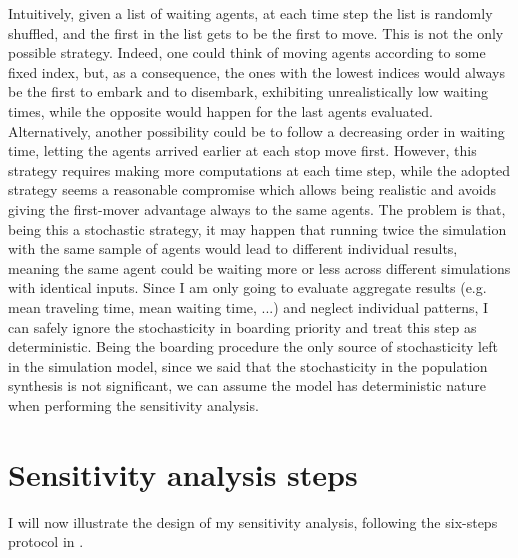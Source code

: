 Intuitively, given a list of waiting agents, at each time step the list is randomly shuffled, and the first in the list gets to be the first to move. This is not the only possible strategy. Indeed, one could think of moving agents according to some fixed index, but, as a consequence, the ones with the lowest indices would always be the first to embark and to disembark, exhibiting unrealistically low waiting times, while the opposite would happen for the last agents evaluated. Alternatively, another possibility could be to follow a decreasing order in waiting time, letting the agents arrived earlier at each stop move first. However, this strategy requires making more computations at each time step, while the adopted strategy seems a reasonable compromise which allows being realistic and avoids giving the first-mover advantage always to the same agents. The problem is that, being this a stochastic strategy, it may happen that running twice the simulation with the same sample of agents would lead to different individual results, meaning the same agent could be waiting more or less across different simulations with identical inputs. Since I am only going to evaluate aggregate results (e.g. mean traveling time, mean waiting time, ...) and neglect individual patterns, I can safely ignore the stochasticity in boarding priority and treat this step as deterministic. Being the boarding procedure the only source of stochasticity left in the simulation model, since we said that the stochasticity in the population synthesis is not significant, we can assume the model has deterministic nature when performing the sensitivity analysis.


\section{Sensitivity analysis steps} \label{sec:ch4_steps}
I will now illustrate the design of my sensitivity analysis, following the six-steps protocol in \textcite{Borgonovo2022SensitivityAO}. 
